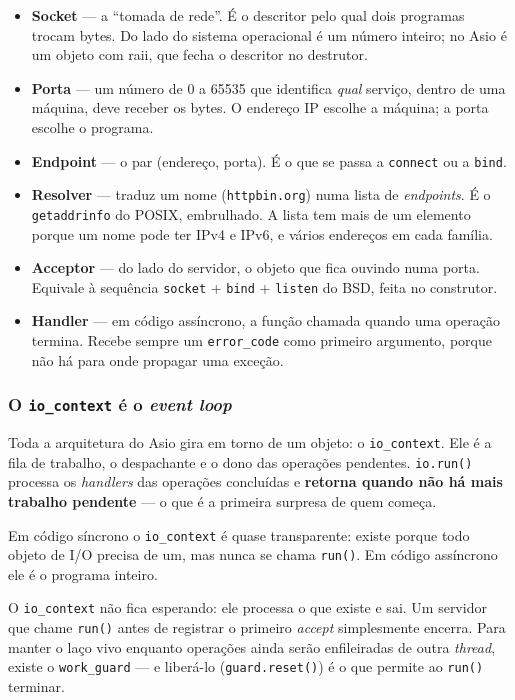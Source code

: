 \begin{itemize}
  \item \textbf{Socket} --- a ``tomada de rede''. É o descritor pelo qual dois
        programas trocam bytes. Do lado do sistema operacional é um número
        inteiro; no Asio é um objeto com \gls{raii}, que fecha o descritor no
        destrutor.
  \item \textbf{Porta} --- um número de 0 a 65535 que identifica \emph{qual}
        serviço, dentro de uma máquina, deve receber os bytes. O endereço IP
        escolhe a máquina; a porta escolhe o programa.
  \item \textbf{Endpoint} --- o par (endereço, porta). É o que se passa a
        \texttt{connect} ou a \texttt{bind}.
  \item \textbf{Resolver} --- traduz um nome (\texttt{httpbin.org}) numa lista
        de \emph{endpoints}. É o \texttt{getaddrinfo} do POSIX, embrulhado. A
        lista tem mais de um elemento porque um nome pode ter IPv4 e IPv6, e
        vários endereços em cada família.
  \item \textbf{Acceptor} --- do lado do servidor, o objeto que fica ouvindo
        numa porta. Equivale à sequência \texttt{socket} + \texttt{bind} +
        \texttt{listen} do BSD, feita no construtor.
  \item \textbf{Handler} --- em código assíncrono, a função chamada quando uma
        operação termina. Recebe sempre um \texttt{error\_code} como primeiro
        argumento, porque não há para onde propagar uma exceção.
\end{itemize}

\subsubsection{O \texttt{io\_context} é o \emph{event loop}}

Toda a arquitetura do Asio gira em torno de um objeto: o \texttt{io\_context}.
Ele é a fila de trabalho, o despachante e o dono das operações pendentes.
\texttt{io.run()} processa os \emph{handlers} das operações concluídas e
\textbf{retorna quando não há mais trabalho pendente} --- o que é a primeira
surpresa de quem começa.

Em código síncrono o \texttt{io\_context} é quase transparente: existe porque
todo objeto de I/O precisa de um, mas nunca se chama \texttt{run()}. Em código
assíncrono ele é o programa inteiro.

\begin{armadilha}
O \texttt{io\_context} não fica esperando: ele processa o que existe e sai. Um
servidor que chame \texttt{run()} antes de registrar o primeiro \emph{accept}
simplesmente encerra. Para manter o laço vivo enquanto operações ainda serão
enfileiradas de outra \emph{thread}, existe o \texttt{work\_guard} --- e
liberá-lo (\texttt{guard.reset()}) é o que permite ao \texttt{run()} terminar.
\end{armadilha}

